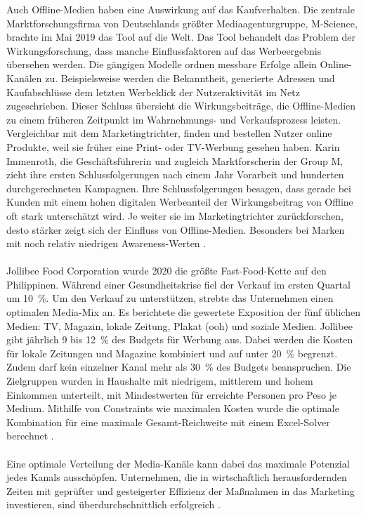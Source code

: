 Auch Offline-Medien haben eine Auswirkung auf das Kaufverhalten. Die zentrale Marktforschungsfirma von Deutschlands größter Mediaagenturgruppe, M-Science, brachte im Mai 2019 das Tool  auf die Welt. Das Tool behandelt das Problem der Wirkungsforschung, dass manche Einflussfaktoren auf das Werbeergebnis übersehen werden. Die gängigen Modelle ordnen messbare Erfolge allein Online-Kanälen zu. Beispielsweise werden die Bekanntheit, generierte Adressen und Kaufabschlüsse dem letzten Werbeklick der Nutzeraktivität im Netz zugeschrieben. Dieser Schluss übersieht die Wirkungsbeiträge, die Offline-Medien zu einem früheren Zeitpunkt im Wahrnehmungs- und Verkaufsprozess leisten. Vergleichbar mit dem Marketingtrichter, finden und bestellen Nutzer online Produkte, weil sie früher eine Print- oder TV-Werbung gesehen haben. Karin Immenroth, die Geschäftsführerin und zugleich Marktforscherin der Group M, zieht ihre ersten Schlussfolgerungen nach einem Jahr Vorarbeit und hunderten durchgerechneten Kampagnen. Ihre Schlussfolgerungen besagen, dass gerade bei Kunden mit einem hohen digitalen Werbeanteil der Wirkungsbeitrag von Offline oft stark unterschätzt wird. Je weiter sie im Marketingtrichter zurückforschen, desto stärker zeigt sich der Einfluss von Offline-Medien. Besonders bei Marken mit noch relativ niedrigen Awareness-Werten \cite[S. 4]{20190411492848}.
\\\\
Jollibee Food Corporation wurde 2020 die größte Fast-Food-Kette auf den Philippinen. Während einer Gesundheitskrise fiel der Verkauf im ersten Quartal um 10~\%. Um den Verkauf zu unterstützen, strebte das Unternehmen einen optimalen Media-Mix an. Es berichtete die gewertete Exposition der fünf üblichen Medien: TV, Magazin, lokale Zeitung, Plakat (\ac{ooh}) und soziale Medien. Jollibee gibt jährlich 9 bis 12~\% des Budgets für Werbung aus. Dabei werden die Kosten für lokale Zeitungen und Magazine kombiniert und auf unter 20~\% begrenzt. Zudem darf kein einzelner Kanal mehr als 30~\% des Budgets beanspruchen. Die Zielgruppen wurden in Haushalte mit niedrigem, mittlerem und hohem Einkommen unterteilt, mit Mindestwerten für erreichte Personen pro Peso je Medium. Mithilfe von Constraints wie maximalen Kosten wurde die optimale Kombination für eine maximale Gesamt-Reichweite mit einem Excel-Solver berechnet \cite{Tapiceria2020}. \\\\
Eine optimale Verteilung der Media-Kanäle kann dabei das maximale Potenzial jedes Kanals ausschöpfen. Unternehmen, die in wirtschaftlich herausfordernden Zeiten mit geprüfter und gesteigerter Effizienz der Maßnahmen in das Marketing investieren, sind überdurchschnittlich erfolgreich \cite{237097}. \\\\ 
